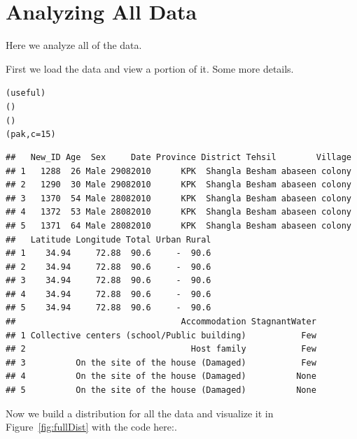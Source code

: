 \section{Analyzing All Data}
\label{sec:overall}
Here we analyze all of the data.

First we load the data and view a portion of it. Some more details.
\begin{knitrout}
\color{fgcolor}\begin{kframe}
\begin{alltt}
(useful)
()
()
(pak, c = 15)
\end{alltt}
\begin{verbatim}
##   New_ID Age  Sex     Date Province District Tehsil        Village
## 1   1288  26 Male 29082010      KPK  Shangla Besham abaseen colony
## 2   1290  30 Male 29082010      KPK  Shangla Besham abaseen colony
## 3   1370  54 Male 28082010      KPK  Shangla Besham abaseen colony
## 4   1372  53 Male 28082010      KPK  Shangla Besham abaseen colony
## 5   1371  64 Male 28082010      KPK  Shangla Besham abaseen colony
##   Latitude Longitude Total Urban Rural
## 1    34.94     72.88  90.6     -  90.6
## 2    34.94     72.88  90.6     -  90.6
## 3    34.94     72.88  90.6     -  90.6
## 4    34.94     72.88  90.6     -  90.6
## 5    34.94     72.88  90.6     -  90.6
##                                 Accommodation StagnantWater
## 1 Collective centers (school/Public building)           Few
## 2                                 Host family           Few
## 3          On the site of the house (Damaged)           Few
## 4          On the site of the house (Damaged)          None
## 5          On the site of the house (Damaged)          None
\end{verbatim}
\end{kframe}
\end{knitrout}





Now we build a distribution for all the data and visualize it in Figure~\ref{fig:fullDist} with the code here:.
\begin{knitrout}
\color{fgcolor}
\end{knitrout}


